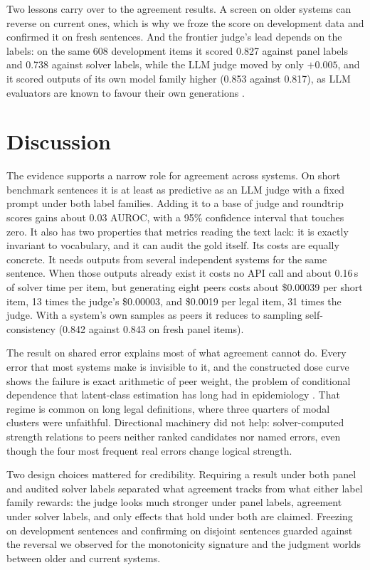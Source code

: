 \documentclass[11pt,letterpaper]{article}
\begin{document}
Two lessons carry over to the agreement results. A screen on older systems can reverse on current ones, which is why we froze the score on development data and confirmed it on fresh sentences. And the frontier judge's lead depends on the labels: on the same 608 development items it scored 0.827 against panel labels and 0.738 against solver labels, while the LLM judge moved by only $+0.005$, and it scored outputs of its own model family higher (0.853 against 0.817), as LLM evaluators are known to favour their own generations \citep{Panickssery2024}.

\section{Discussion}
\label{sec:discussion}

The evidence supports a narrow role for agreement across systems. On short benchmark sentences it is at least as predictive as an LLM judge with a fixed prompt under both label families. Adding it to a base of judge and roundtrip scores gains about 0.03 AUROC, with a 95\% confidence interval that touches zero. It also has two properties that metrics reading the text lack: it is exactly invariant to vocabulary, and it can audit the gold itself. Its costs are equally concrete. It needs outputs from several independent systems for the same sentence. When those outputs already exist it costs no API call and about 0.16\,s of solver time per item, but generating eight peers costs about \$0.00039 per short item, 13 times the judge's \$0.00003, and \$0.0019 per legal item, 31 times the judge. With a system's own samples as peers it reduces to sampling self-consistency (0.842 against 0.843 on fresh panel items).

The result on shared error explains most of what agreement cannot do. Every error that most systems make is invisible to it, and the constructed dose curve shows the failure is exact arithmetic of peer weight, the problem of conditional dependence that latent-class estimation has long had in epidemiology \citep{Albert2004}. That regime is common on long legal definitions, where three quarters of modal clusters were unfaithful. Directional machinery did not help: solver-computed strength relations to peers neither ranked candidates nor named errors, even though the four most frequent real errors change logical strength.

Two design choices mattered for credibility. Requiring a result under both panel and audited solver labels separated what agreement tracks from what either label family rewards: the judge looks much stronger under panel labels, agreement under solver labels, and only effects that hold under both are claimed. Freezing on development sentences and confirming on disjoint sentences guarded against the reversal we observed for the monotonicity signature and the judgment worlds between older and current systems.
\end{document}
